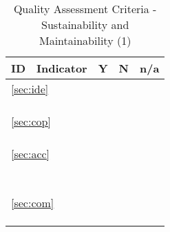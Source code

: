 \documentclass[a4paper,11pt]{article}
\begin{document}
\begin{table}[hbt]
	\begin{tabular}
		{ p{} | 
		  p{} |
		  p{} |
		  p{} |
		  p{} }
		\hline
		\textbf{ID} & \textbf{Indicator} & \textbf{Y} & \textbf{N} & \textbf{n/a} \\
		\hline
		\multicolumn{5}{l}{\ref{sec:ide}{ }\nameref{sec:ide}} \\
		\hline
		\hyperref[id:id1]{\idOneID} & \idOneText & & & \\
		\hyperref[id:id2]{\idTwoID} & \idTwoText & & & \\
		\hyperref[id:id3]{\idThreeID} & \idThreeText & & & \\
		\hline
		\multicolumn{5}{l}{\ref{sec:cop}{ }\nameref{sec:cop}} \\
		\hline
		\hyperref[id:cp1]{\cpOneID} & \cpOneText & & & \\
		\hyperref[id:cp2]{\cpTwoID} & \cpTwoText & & & \\
		\hyperref[id:cp3]{\cpThreeID} & \cpThreeText & & & \\
		\hline
		\multicolumn{5}{l}{\ref{sec:acc}{ }\nameref{sec:acc}} \\
		\hline
		\hyperref[id:ac1]{\acOneID} & \acOneText & & & \\
		\hyperref[id:ac2]{\acTwoID} & \acTwoText & & & \\
		\hyperref[id:ac3]{\acThreeID} & \acThreeText & & & \\
		\hyperref[id:ac4]{\acFourID} & \acFourText & & & \\
		\hyperref[id:ac5]{\acFiveID} & \acFiveText & & & \\
		\hyperref[id:ac6]{\acSixID} & \acSixText & & & \\
		\hyperref[id:ac7]{\acSevenID} & \acSevenText & & & \\
		\hline
		\multicolumn{5}{l}{\ref{sec:com}{ }\nameref{sec:com}} \\
		\hline
		\hyperref[id:cm1]{\cmOneID} & \cmOneText & & & \\
		\hyperref[id:cm2]{\cmTwoID} & \cmTwoText & & & \\
		\hyperref[id:cm3]{\cmThreeID} & \cmThreeText & & & \\
		\hline
	\end{tabular}
	\caption{Quality Assessment Criteria - Sustainability and Maintainability (1)}
	\label{tab:criteriaSustMaint1}
\end{table}
\end{document}
